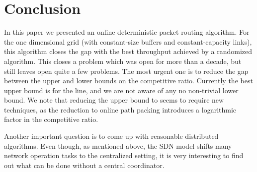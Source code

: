 \documentclass[11pt]{article}
\newenvironment{proof sketch}[1]{\noindent {\emph{Proof sketch of #1:}}}{\hfill \qed}
\begin{document}
\begin{comment}
\paragraph{Remark.}
The space-time graph seems to assign symmetric roles to the time axis and the space
axis.  Such a symmetry would imply that one could reduce the case of large buffers to
the case of large link capacities. However, this is not true due to the definition of
a destination.  A destination (in the space-time graph) is a row of
vertices (namely, the set of copies of an original vertex).
This implies that one cannot simply transpose the graph and exchange the roles of
space and time.
\end{comment}

\section{Conclusion}
\label{sec:conc}
In this paper we presented an online deterministic packet routing algorithm.  For the
one dimensional grid (with constant-size buffers and constant-capacity links), this
algorithm closes the gap with the best throughput achieved by a randomized
algorithm.  This closes a problem which was open for more than a decade, but still
leaves open quite a few problems. The most urgent one is to reduce the gap between
the upper and lower bounds on the competitive ratio. Currently the best upper bound
is  for the line, and we are not aware of any no non-trivial lower bound.
We note that reducing the upper bound to  seems to require new techniques,
as the reduction to online path packing introduces a logarithmic factor in the
competitive ratio.

Another important question is to come up with reasonable distributed
algorithms. Even though, as mentioned above, the SDN model shifts many
network operation tasks to the centralized setting, it is very
interesting to find out what can be done without a central
coordinator.
\end{document}
